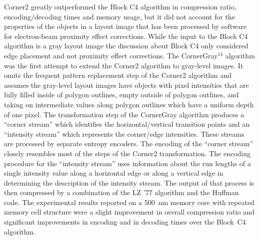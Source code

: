 \documentclass{article}
\begin{document}
Corner2 greatly outperformed the Block C4 algorithm
in compression
ratio, encoding/decoding times and memory usage, but it did
not account for the properties of the objects in a layout image that has
been processed by software for electron-beam proximity effect corrections.
While the input to the Block C4 algorithm is a gray layout image the discussion
about Block C4 only considered edge placement and not proximity effect
corrections.   The CornerGray$^{14}$ algorithm was the first attempt
to extend the Corner2 algorithm to gray-level images.  It omits the frequent
pattern replacement step of the Corner2 algorithm and assumes the gray-level
layout images have objects with pixel intensities that are fully filled 
inside of polygon outlines, empty outside of polygon outlines, and taking
on intermediate values along polygon outlines which have a uniform depth
of one pixel.  The transformation step of the CornerGray algorithm 
produces a ``corner stream'' which identifies the horizontal/vertical
transition points and an ``intensity stream'' which represents the 
corner/edge intensities.  These streams are processed by separate entropy
encoders.  The encoding of the ``corner stream'' closely resembles most of
the steps of the Corner2 transformation.  The encoding procedure for the
``intensity stream'' uses information about the run lengths of a single 
intensity
value along a horizontal edge or along a vertical edge in determining
the description of the intensity stream.  The output of that process is then
compressed by a combination of the LZ '77 algorithm and the Huffman code.
The experimental results reported on a 500~nm memory core with repeated
memory cell structure were a slight improvement in overall compression ratio
and significant improvements in encoding and in decoding times over the
Block~C4 algorithm.
\end{document}
